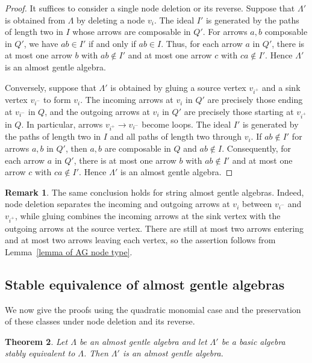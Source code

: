 \documentclass[11pt]{article}
\providecommand{\varLambda}{\Lambda}
\newtheorem{theorem}{Theorem}[section]
\theoremstyle{definition}
\newtheorem{remark}[theorem]{Remark}
\begin{document}
		
		\begin{proof}
			It suffices to consider a single node deletion or its reverse.
			Suppose that $\varLambda'$ is obtained from $\varLambda$ by deleting a node $v_i$.
			The ideal $I'$ is generated by the paths of length two in $I$ whose arrows are composable in $Q'$.
			For arrows $a,b$ composable in $Q'$, we have $ab\in I'$ if and only if $ab\in I$.
			Thus, for each arrow $a$ in $Q'$, there is at most one arrow $b$ with $ab\notin I'$ and at most one arrow $c$ with $ca\notin I'$.
			Hence $\varLambda'$ is an almost gentle algebra.

			Conversely, suppose that $\varLambda'$ is obtained by gluing a source vertex $v_{i^+}$ and a sink vertex $v_{i^-}$ to form $v_i$.
			The incoming arrows at $v_i$ in $Q'$ are precisely those ending at $v_{i^-}$ in $Q$, and the outgoing arrows at $v_i$ in $Q'$ are precisely those starting at $v_{i^+}$ in $Q$.
			In particular, arrows $v_{i^+}\to v_{i^-}$ become loops.
			The ideal $I'$ is generated by the paths of length two in $I$ and all paths of length two through $v_i$.
			If $ab\notin I'$ for arrows $a,b$ in $Q'$, then $a,b$ are composable in $Q$ and $ab\notin I$.
			Consequently, for each arrow $a$ in $Q'$, there is at most one arrow $b$ with $ab\notin I'$ and at most one arrow $c$ with $ca\notin I'$.
			Hence $\varLambda'$ is an almost gentle algebra.
		\end{proof}


		\begin{remark}\label{remark of SAG node type}
			The same conclusion holds for string almost gentle algebras.
			Indeed, node deletion separates the incoming and outgoing arrows at $v_i$ between $v_{i^-}$ and $v_{i^+}$, while gluing combines the incoming arrows at the sink vertex with the outgoing arrows at the source vertex.
			There are still at most two arrows entering and at most two arrows leaving each vertex, so the assertion follows from Lemma~\ref{lemma of AG node type}.
		\end{remark}



	\subsection{Stable equivalence of almost gentle algebras}

		We now give the proofs using the quadratic monomial case and the preservation of these classes under node deletion and its reverse.


		\begin{theorem}\label{theorem of AG stable closure}
			Let $\varLambda$ be an almost gentle algebra and let $\varLambda'$ be a basic algebra stably equivalent to $\varLambda$.
			Then $\varLambda'$ is an almost gentle algebra.
		\end{theorem}
\end{document}
